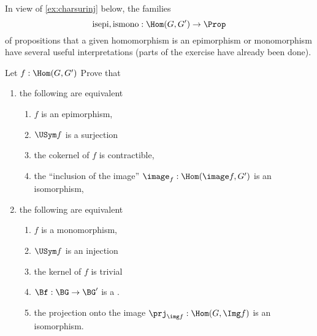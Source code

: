 In view of \cref{ex:charsurinj} below, the families
$$\mathrm{isepi},\mathrm{ismono}:\Hom(G,G')\to\Prop
$$
of propositions that a given homomorphism is an epimorphism or monomorphism have several useful interpretations (parts of the exercise have already been done).
\begin{xca}
  \label{ex:charsurinj}
  Let $f:\Hom(G,G')$ Prove that
  \begin{enumerate}
  \item the following are equivalent
    \begin{enumerate}
    \item $f$ is an epimorphism,
    \item $\USym f$ is a surjection
    \item the cokernel of $f$ is contractible,
    \item the ``inclusion of the image'' $\image_f:\Hom(\image f,G')$ is an isomorphism,
    \end{enumerate}
  \item the following are equivalent
    \begin{enumerate}
    \item $f$ is a monomorphism,
    \item $\USym f$ is an injection
\item the kernel of $f$ is trivial
\item $\Bf:\BG\to \BG'$ is a \covering.
\item the projection onto the image $\prj_{\img f}:\Hom(G,\Img f)$ is an isomorphism.
    \end{enumerate}
  \end{enumerate}
\end{xca}







